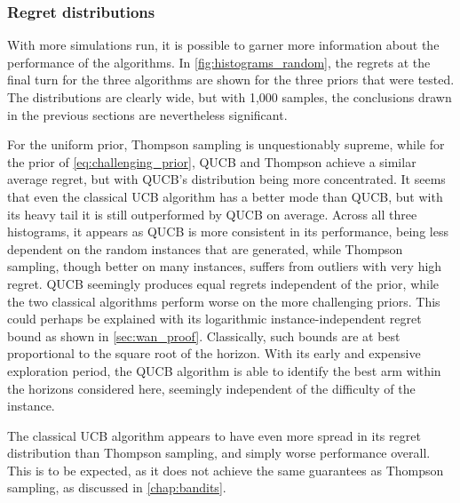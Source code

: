 \clearpage

\subsubsection{Regret distributions}
With more simulations run, it is possible to garner more information about the performance of the algorithms.
In \cref{fig:histograms_random}, the regrets at the final turn for the three algorithms are shown for the three priors that were tested.
The distributions are clearly wide, but with 1,000 samples, the conclusions drawn in the previous sections are nevertheless significant.

For the uniform prior, Thompson sampling is unquestionably supreme, while for the prior of \cref{eq:challenging_prior}, QUCB and Thompson achieve a similar average regret, but with QUCB's distribution being more concentrated.
It seems that even the classical UCB algorithm has a better mode than QUCB, but with its heavy tail it is still outperformed by QUCB on average.
Across all three histograms, it appears as QUCB is more consistent in its performance, being less dependent on the random instances that are generated, while Thompson sampling, though better on many instances, suffers from outliers with very high regret.
QUCB seemingly produces equal regrets independent of the prior, while the two classical algorithms perform worse on the more challenging priors.
This could perhaps be explained with its logarithmic instance-independent regret bound as shown in \cref{sec:wan_proof}.
Classically, such bounds are at best proportional to the square root of the horizon.
With its early and expensive exploration period, the QUCB algorithm is able to identify the best arm within the horizons considered here, seemingly independent of the difficulty of the instance.

The classical UCB algorithm appears to have even more spread in its regret distribution than Thompson sampling, and simply worse performance overall.
This is to be expected, as it does not achieve the same guarantees as Thompson sampling, as discussed in \cref{chap:bandits}.



